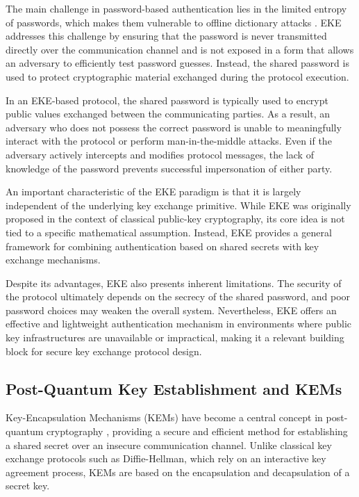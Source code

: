 \documentclass[12pt]{article}
\begin{document}
The main challenge in password-based authentication lies in the limited entropy of passwords, which makes them vulnerable to offline dictionary attacks \cite{bellovin1992}. EKE addresses this challenge by ensuring that the password is never transmitted directly over the communication channel and is not exposed in a form that allows an adversary to efficiently test password guesses. Instead, the shared password is used to protect cryptographic material exchanged during the protocol execution.

In an EKE-based protocol, the shared password is typically used to encrypt public values exchanged between the communicating parties. As a result, an adversary who does not possess the correct password is unable to meaningfully interact with the protocol or perform man-in-the-middle attacks. Even if the adversary actively intercepts and modifies protocol messages, the lack of knowledge of the password prevents successful impersonation of either party.

An important characteristic of the EKE paradigm is that it is largely independent of the underlying key exchange primitive. While EKE was originally proposed in the context of classical public-key cryptography, its core idea is not tied to a specific mathematical assumption. Instead, EKE provides a general framework for combining authentication based on shared secrets with key exchange mechanisms.

Despite its advantages, EKE also presents inherent limitations. The security of the protocol ultimately depends on the secrecy of the shared password\cite{bellovin1992}, and poor password choices may weaken the overall system. Nevertheless, EKE offers an effective and lightweight authentication mechanism in environments where public key infrastructures are unavailable or impractical, making it a relevant building block for secure key exchange protocol design.




\subsection{Post-Quantum Key Establishment and KEMs}

Key-Encapsulation Mechanisms (KEMs) have become a central concept in post-quantum cryptography \cite{nist2024}, providing a secure and efficient method for establishing a shared secret over an insecure communication channel. Unlike classical key exchange protocols such as Diffie-Hellman, which rely on an interactive key agreement process, KEMs are based on the encapsulation and decapsulation of a secret key.
\end{document}
